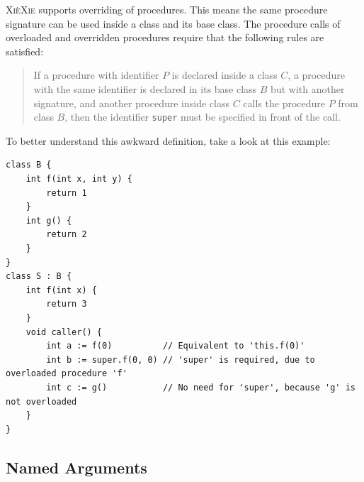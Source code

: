 \documentclass[a5paper]{report}
\def\xiexie{\textsc{Xi\`eXie}\xspace}
\begin{document}
\xiexie supports overriding of procedures. This means the same procedure signature can be used inside a class and its
base class. The procedure calls of overloaded and overridden procedures require that the following rules are satisfied:
\begin{quote}
	If a procedure with identifier $P$ is declared inside a class $C$, a procedure with the same identifier is declared
	in its base class $B$ but with another signature, and another procedure inside class $C$ calls the procedure $P$
	from class $B$, then the identifier \texttt{super} must be specified in front of the call.
\end{quote}
To better understand this awkward definition, take a look at this example:
\begin{lstlisting}
class B {
    int f(int x, int y) {
        return 1
    }
    int g() {
        return 2
    }
}
class S : B {
    int f(int x) {
        return 3
    }
    void caller() {
        int a := f(0)          // Equivalent to 'this.f(0)'
        int b := super.f(0, 0) // 'super' is required, due to overloaded procedure 'f'
        int c := g()           // No need for 'super', because 'g' is not overloaded
    }
}
\end{lstlisting}

\subsection{Named Arguments}
\end{document}
